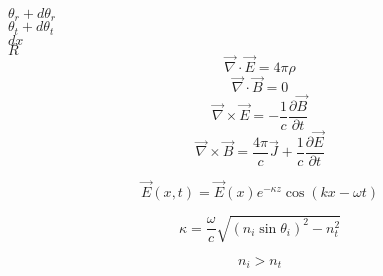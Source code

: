 \documentclass{report}
\newcommand\ddfrac[2]{\frac{\displaystyle #1}{\displaystyle #2}}
\begin{document}
$\theta_r + d\theta_r$\\
$\theta_t + d\theta_t$\\
$dx$\\
$R$\\
$$ \vec{\nabla} \cdot \vec{E} = 4\pi\rho $$
$$ \vec{\nabla} \cdot \vec{B} = 0 $$
$$ \vec{\nabla} \times \vec{E} = -\ddfrac{1}{c}\ddfrac{\partial\vec{B}}{\partial{t}}$$
$$ \vec{\nabla} \times \vec{B} = \ddfrac{4\pi}{c}\vec{J} + \ddfrac{1}{c}\ddfrac{\partial\vec{E}}{\partial{t}} $$

$$ \vec{E}(x,t) = \vec{E}(x)e^{-\kappa z}\cos(kx-\omega t)$$

$$ \kappa = \ddfrac{\omega}{c}\sqrt{\left(n_i\sin\theta_i\right)^2-n_t^2} $$

$$ n_i > n_t $$
\end{document}
